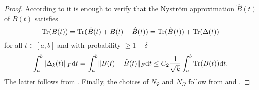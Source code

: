\begin{proof}
    According to  it is enough to verify that the Nystr\"om approximation $\hat{B}(t)$ of $B(t)$ satisfies
    \begin{equation}
        \operatorname{Tr}(B(t)) = \operatorname{Tr}(\hat{B}(t) + B(t) - \hat{B}(t)) = \operatorname{Tr}(\hat{B}(t)) + \operatorname{Tr}(\Delta(t))
    \end{equation}
    for all $t \in [a, b]$ and with probability $\geq 1 - \delta$
    \begin{equation}
        \int_{a}^{b} \lVert \Delta_k(t) \rVert _F \mathrm{d}t = \int_{a}^{b} \lVert B(t) - \hat{B}(t) \rVert _F \mathrm{d}t \leq C_2 \frac{1}{\sqrt{k}} \int_{a}^{b} \operatorname{Tr}(B(t)) \mathrm{d}t.
    \end{equation}
    The latter follows from . Finally, the choices of $N_{\Psi}$ and $N_{\Omega}$ follow from  and .
\end{proof}
